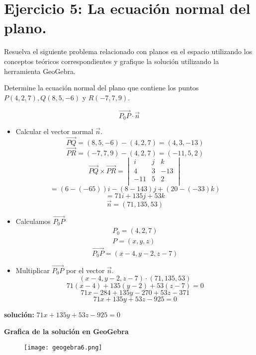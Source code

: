 \section{\large Ejercicio 5: La ecuación normal del plano.}

Resuelva el siguiente problema relacionado con planos en el espacio utilizando los conceptos teóricos correspondientes y grafique la solución utilizando la herramienta GeoGebra.

Determine la ecuación normal del plano que contiene los puntos $P(4,2,7),Q(8,5,-6)$ y $R(-7,7,9)$.

\[\vec{P_0P}\cdot\vec{n}\]
\begin{itemize}
    \item Calcular el vector normal $\vec{n}$.
    \[\vec{PQ}=(8,5,-6)-(4,2,7)=(4,3,-13)\]
    \[\vec{PR}=(-7,7,9)-(4,2,7)=(-11,5,2)\]
    \[
        \vec{PQ}\times\vec{PR} = 
        \begin{vmatrix}
            i & j & k \\
            4 & 3 & -13 \\
            -11 & 5 & 2 \\
        \end{vmatrix}
    \]
    \[=(6-(-65))i-(8-143)j+(20-(-33)k)\]
    \[=71i+135j+53k\]
    \[\vec{n}=(71,135,53)\]
    \item Calculamos \(\vec{P_0P}\)
    \[
        \begin{aligned}
            P_0=(4,2,7) \\
            P=(x,y,z)  
        \end{aligned}
    \]
    \[
        \vec{P_0P}=(x-4,y-2,z-7)
    \]
    \item Multiplicar $\vec{P_0P}$ por el vector $\vec{n}$.
    \[(x-4,y-2,z-7)\cdot(71,135,53)\]
    \[71(x-4)+135(y-2)+53(z-7)=0\]
    \[71x-284+135y-270+53z-371\]
    \[71x+135y+53z-925=0\]
\end{itemize}
\begin{center}
    \textbf{solución:} $71x+135y+53z-925=0$
\end{center}

\newpage
\textbf{Grafica de la solución en GeoGebra}
\begin{figure}[ht!]
    \texttt{[image: geogebra6.png]}
\end{figure}
